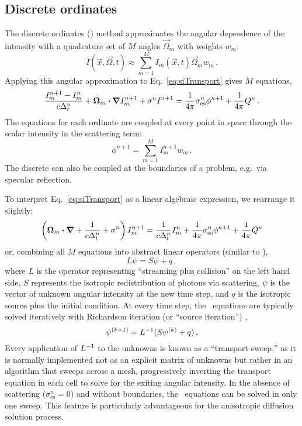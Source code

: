\subsection{Discrete ordinates}

The discrete ordinates (\SN) method approximates the angular dependence of the
intensity with a quadrature set of $M$ angles $\vec{\Omega}_m$ with weights $w_m$:
\begin{equation*}
  I(\vec{x},\vec{\Omega},t) \approx \sum_{m=1}^M I_m(\vec{x},t) \vec{\Omega}_m w_m\,.
\end{equation*}
Applying this angular approximation to Eq.~\eqref{eq:siTransport} gives $M$
equations,
\begin{equation}\label{eq:siTransport}
  \frac{I_{m}^{n+1} - I_{m}^n}{c \Delta_t^n}
  + \bm{\Omega}_{m} \bm{\cdot} \bm{\nabla} I_{m}^{n+1}
  + \sigma^n I^{n+1}
  = \frac{1}{4\pi} \sigma_\mathrm{es}^n \phi^{n+1}
  + \frac{1}{4\pi} Q^n\,.
\end{equation}
The equations for each ordinate are coupled at every point in space through the
scalar intensity in the scattering term:
\begin{equation*}
  \phi^{n+1} = \sum_{m=1}^M I_m^{n+1} w_m \,.
\end{equation*}
The discrete can also be coupled at the boundaries of a problem, e.g.~via
specular reflection.

To interpret Eq.~\eqref{eq:siTransport} as a linear algebraic expression, we
rearrange it slightly:
\begin{equation*}
  \left( \bm{\Omega}_{m} \bm{\cdot} \bm{\nabla} + \frac{1}{c\Delta_t^n}
  + \sigma^n \right) I_{m}^{n+1}
  = \frac{1}{c\Delta_t^n} I_{m}^n
  + \frac{1}{4\pi} \sigma_\mathrm{es}^n \phi^{n+1}
  + \frac{1}{4\pi} Q^n
\end{equation*}
or, combining all $M$ equations into abstract linear operators (similar to
\cite{War2004}),
\begin{equation*}
  L \psi = S \psi + q\,,
\end{equation*}
where $L$ is the operator representing ``streaming plus collision'' on the left
hand side, $S$ represents the isotropic redistribution of photons via
scattering, $\psi$ is the vector of unknown angular intensity at the new time
step, and $q$ is the isotropic source plus the initial condition. At every time
step, the \SN\ equations are typically solved iteratively with Richardson
iteration (or ``source iteration'') \cite{Lew1984},
\begin{equation*}
  \psi^{(k+1)} = L^{-1} ( S \psi^{(k)} + q )\,.
\end{equation*}
Every application of $L^{-1}$ to the unknowns is known as a ``transport sweep,''
as it is normally implemented not as an explicit matrix of unknowns but rather in
an algorithm that sweeps across a mesh, progressively inverting the transport
equation in each cell to solve for the exiting angular intensity.
In the absence of scattering ($\sigma_\mathrm{es}^n=0$) and without boundaries,
the \SN\ equations can be solved in only one sweep. This feature is particularly
advantageous for the anisotropic diffusion solution process.

